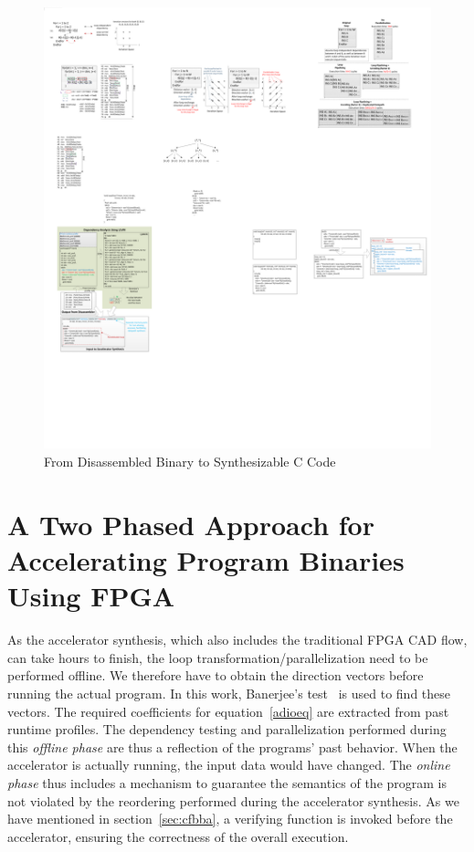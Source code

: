\begin{figure}[htp]
\begin{center}
\includegraphics[width=0.9\linewidth]{chap6fig/analysisSteps.pdf}
\caption{From Disassembled Binary to Synthesizable C Code
\label{fig:mainSteps}}
\end{center}
\end{figure}

\section{A Two Phased Approach for Accelerating Program Binaries Using FPGA}
\label{makingAcc}
As the accelerator synthesis, which also includes the traditional FPGA CAD flow,
can take hours to finish, the loop transformation/parallelization need to be performed offline. We therefore have to obtain the direction vectors 
before running the actual program. 
In this work, Banerjee's test~\cite{banerjee} is used to find these vectors. The required coefficients for equation~\ref{adioeq} are extracted from past runtime profiles. The dependency testing and parallelization performed during this \textit{offline phase} are  thus a reflection of the programs' past behavior. When the accelerator is actually running, the input data would have changed. The \textit{online phase} thus includes a mechanism to guarantee the 
semantics of the program is not violated by the reordering performed during
the accelerator synthesis. As we have mentioned in section~\ref{sec:cfbba},
a verifying function is invoked before the accelerator, ensuring the correctness
of the overall execution. 



